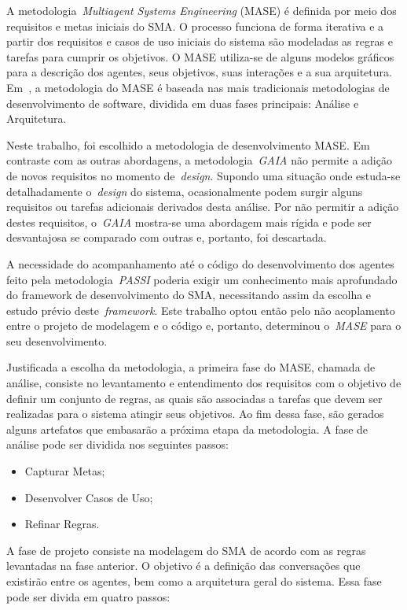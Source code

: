 A metodologia~\emph{Multiagent Systems Engineering} (MASE) é definida por meio dos requisitos e metas iniciais do SMA. O processo funciona de forma iterativa e a partir dos requisitos e casos de uso iniciais do sistema são modeladas as regras e tarefas para cumprir os objetivos. O MASE utiliza-se de alguns modelos gráficos para a descrição dos agentes, seus objetivos, suas interações e a sua arquitetura. Em~\cite{scott01}, a metodologia do MASE é baseada nas mais tradicionais metodologias de desenvolvimento de software, dividida em duas fases principais: Análise e Arquitetura.

Neste trabalho, foi escolhido a metodologia de desenvolvimento MASE. Em contraste com as outras abordagens, a metodologia~\emph{GAIA} não permite a adição de novos requisitos no momento de~\emph{design}. Supondo uma situação onde estuda-se detalhadamente o~\emph{design} do sistema, ocasionalmente podem surgir alguns requisitos ou tarefas adicionais derivados desta análise. Por não permitir a adição destes requisitos, o~\emph{GAIA} mostra-se uma abordagem mais rígida e pode ser desvantajosa se comparado com outras e, portanto, foi descartada.

A necessidade do acompanhamento até o código do desenvolvimento dos agentes feito pela metodologia~\emph{PASSI} poderia exigir um conhecimento mais aprofundado do framework de desenvolvimento do SMA, necessitando assim da escolha e estudo prévio deste~\emph{framework}. Este trabalho optou então pelo não acoplamento entre o projeto de modelagem e o código e, portanto, determinou o~\emph{MASE} para o seu desenvolvimento.

Justificada a escolha da metodologia, a primeira fase do MASE, chamada de análise, consiste no levantamento e entendimento dos requisitos com o objetivo de definir um conjunto de regras, as quais são associadas a tarefas que devem ser realizadas para o sistema atingir seus objetivos. Ao fim dessa fase, são gerados alguns artefatos que embasarão a próxima etapa da metodologia. A fase de análise pode ser dividida nos seguintes passos:

\begin{itemize}
	\item Capturar Metas;
	\item Desenvolver Casos de Uso;
	\item Refinar Regras.
\end{itemize}

A fase de projeto consiste na modelagem do SMA de acordo com as regras levantadas na fase anterior. O objetivo é a definição das conversações que existirão entre os agentes, bem como a arquitetura geral do sistema. Essa fase pode ser divida em quatro passos:

